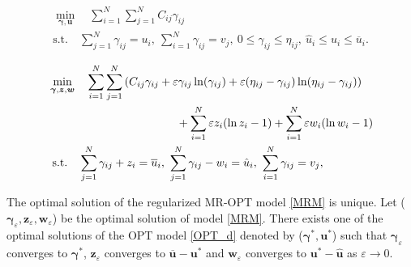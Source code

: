 \documentclass[10pt,a4paper]{amsart}
\begin{document}
 \begin{equation}\label{OPT_d}
     \begin{gathered}
     \min_{\bm{\gamma,u}} \quad \sum_{i=1}^{N}\sum_{j=1}^{N} C_{ij} \gamma_{ij} \\
     \mathrm{s.t.} \quad \sum_{j=1}^{N} \gamma_{ij} = u_i,  \ \sum_{i=1}^{N} \gamma_{ij} = v_j, \ 
        0 \leq \gamma_{ij} \leq \eta_{ij}, \ \hat{u}_i \leq u_i \leq \overline{u}_i.  
     \end{gathered}
 \end{equation}

\begin{equation}\label{MRM}
\begin{aligned}
& \mathtoolsset{multlined-width=0.9\displaywidth}
\begin{multlined}
    \min_{\bm{\gamma}, \bm{z}, \bm{w}} \quad \sum_{i=1}^{N}\sum_{j=1}^{N} \left(C_{ij}\gamma_{ij}+\varepsilon \gamma_{ij} \ln(\gamma_{ij})+\varepsilon (\eta_{ij}-\gamma_{ij}) \ln(\eta_{ij}-\gamma_{ij})\right) \\
    +\sum_{i=1}^{N} \varepsilon z_i (\ln z_i-1)+\sum_{i=1}^{N} \varepsilon w_i (\ln w_i-1)
\end{multlined}
\\
& \text{   s.t.} \quad \sum_{j=1}^{N} \gamma_{ij} + z_i = \overline{u}_i, \ \sum_{j=1}^{N} \gamma_{ij} - w_i = \hat{u}_i, \ \sum_{i=1}^N \gamma_{ij} = v_j,
\end{aligned}
\end{equation}

\begin{theorem}
	The optimal solution of the regularized MR-OPT model \cref{MRM} is unique. Let ($\bm{\gamma}_{\varepsilon}, \bm{z}_{\varepsilon}, \bm{w}_{\varepsilon}$) be the optimal solution of model \cref{MRM}. There exists one of the optimal solutions of the OPT model \cref{OPT_d} denoted by ($\bm{\gamma}^*,\bm{ u}^*$) such that $\bm{\gamma}_{\varepsilon}$ converges to $\bm{\gamma}^*$, $\bm{z}_{\varepsilon}$ converges to $\bm{\overline{u}}-\bm{u}^*$ and $\bm{w}_{\varepsilon}$ converges to $\bm{u}^*-\bm{\hat{u}}$ as $\varepsilon\rightarrow 0$. 
\end{theorem}
\end{document}

